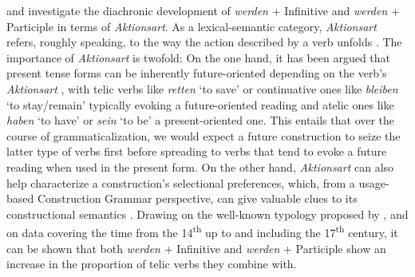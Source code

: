 \documentclass[output=paper,colorlinks,citecolor=brown]{langscibook}
\begin{document}
\citet[]{Hartmann2021}{} and \citet[]{hartmannFuturkonstruktionenImWandel2023}{} investigate the diachronic development of \textit{werden} + Infinitive and \textit{werden} + Participle in terms of \textit{Aktionsart}. As a lexical-semantic category, \textit{Aktionsart} refers, roughly speaking, to the way the action described by a verb unfolds \citep[][]{katnyAktionsart2018}{}{}. The importance of \textit{Aktionsart} is twofold: On the one hand, it has been argued that present tense forms can be inherently future-oriented depending on the verb's \textit{Aktionsart} \citep[][9]{Saltveit1962}{}{}, with telic verbs like \textit{retten} `to save' or continuative ones like \textit{bleiben} `to stay/remain' typically evoking a future-oriented reading and atelic ones like \textit{haben} `to have' or \textit{sein} `to be' a present-oriented one. This entails that over the course of grammaticalization, we would expect a future construction to seize the latter type of verbs first before spreading to verbs that tend to evoke a future reading when used in the present form. On the other hand, \textit{Aktionsart} can also help characterize a construction's selectional preferences, which, from a usage-based Construction Grammar perspective, can give valuable clues to its constructional semantics \citep[][265]{hartmannFuturkonstruktionenImWandel2023}{}{}. Drawing on the well-known typology proposed by \citet[]{Vendler1957}{}, and on data covering the time from the 14\textsuperscript{th} up to and including the 17\textsuperscript{th} century, it can be shown that both \textit{werden} + Infinitive and \textit{werden} + Participle show an increase in the proportion of telic verbs they combine with. 
\end{document}
